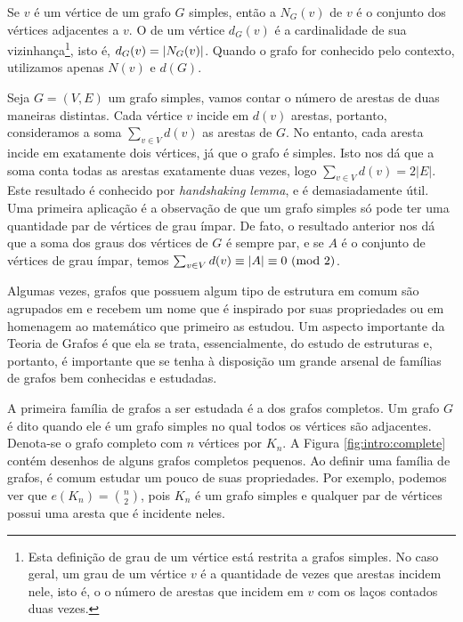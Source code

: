 Se $v$ é um vértice de um grafo $G$ simples, então a  $N_G(v)$ de $v$ é o conjunto dos vértices adjacentes a $v$. O  de um vértice $d_G(v)$ é a cardinalidade de sua vizinhança\footnote{Esta definição de grau de um vértice está restrita a grafos simples. No caso geral, um grau de um vértice $v$ é a quantidade de vezes que arestas incidem nele, isto é, o o número de arestas que incidem em $v$ com os laços contados duas vezes.}, isto é, $d_G(v) = \left | N_G(v) \right |$. Quando o grafo for conhecido pelo contexto, utilizamos apenas $N(v)$ e $d(G)$.

Seja $G = (V,E)$ um grafo simples, vamos contar o número de arestas de duas maneiras distintas. Cada vértice $v$ incide em $d(v)$ arestas, portanto, consideramos a soma $\sum_{v \in V}d(v)$ as arestas de $G$. No entanto, cada aresta incide em exatamente dois vértices, já que o grafo é simples. Isto nos dá que a soma conta todas as arestas exatamente duas vezes, logo $\sum_{v \in V}d(v) = 2|E|$. Este resultado é conhecido por \emph{handshaking lemma}, e é demasiadamente útil. Uma primeira aplicação é a observação de que um grafo simples só pode ter uma quantidade par de vértices de grau ímpar. De fato, o resultado anterior nos dá que a soma dos graus dos vértices de $G$ é sempre par, e se $A$ é o conjunto de vértices de grau ímpar, temos $\sum_{v \in V}d(v) \equiv |A| \equiv 0 \ (\text{mod}\ 2)$.

Algumas vezes, grafos que possuem algum tipo de estrutura em comum são agrupados em  e recebem um nome que é inspirado por suas propriedades ou em homenagem ao matemático que primeiro as estudou. Um aspecto importante da Teoria de Grafos é que ela se trata, essencialmente, do estudo de estruturas e, portanto, é importante que se tenha à disposição um grande arsenal de famílias de grafos bem conhecidas e estudadas.

A primeira família de grafos a ser estudada é a dos grafos completos. Um grafo $G$ é dito   quando ele é um grafo simples no qual todos os vértices são adjacentes. Denota-se o grafo completo com $n$ vértices por $K_n$. A Figura \ref{fig:intro:complete} contém desenhos de alguns grafos completos pequenos. Ao definir uma família de grafos, é comum estudar um pouco de suas propriedades. Por exemplo, podemos ver que $e(K_n) = \binom{n}{2}$, pois $K_n$ é um grafo simples e qualquer par de vértices possui uma aresta que é incidente neles.

